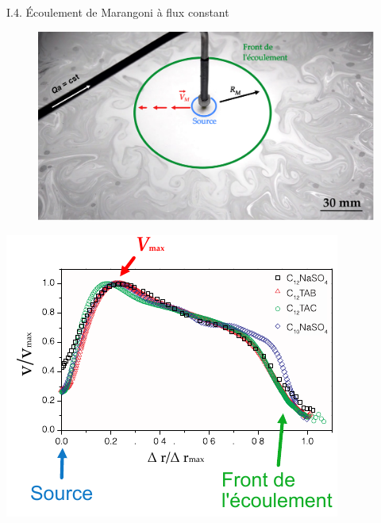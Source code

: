\documentclass[aspectratio=169,10pt]{beamer}
\begin{document}
    
    

    \begin{frame}{I.4. Écoulement de Marangoni à flux constant}
      \begin{minipage}{.45\textwidth}
        \begin{figure}
          \centering
          \includegraphics[width=1\textwidth]{./figures/Ecoulement_Marangoni_2.pdf}
        \end{figure}
      \end{minipage}\hfill
        \begin{minipage}{.45\textwidth}
          \centering
          \includegraphics[scale=.8]{./figures/profil_vitesse_matthieu.pdf}
        \end{minipage}
    \end{frame}
    
\end{document}

